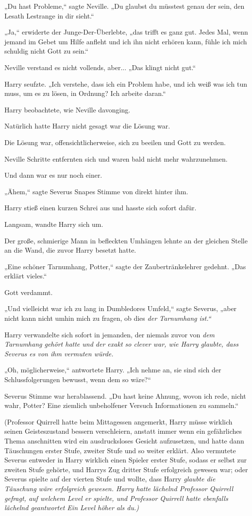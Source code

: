 {„Du hast Probleme,“ sagte Neville. „Du glaubst du müsstest genau der sein, den Lesath Lestrange in dir sieht.“

„Ja,“ erwiderte der Junge-Der-Überlebte, „das trifft es ganz gut. Jedes Mal, wenn jemand im Gebet um Hilfe anfleht und ich ihn nicht erhören kann, fühle ich mich schuldig nicht Gott zu sein.“

Neville verstand es nicht vollends, aber... „Das klingt nicht gut.“

Harry seufzte. „Ich verstehe, dass ich ein Problem habe, und ich weiß was ich tun muss, um es zu lösen, in Ordnung? Ich arbeite daran.“

Harry beobachtete, wie Neville davonging.

Natürlich hatte Harry nicht gesagt war die Lösung war.

Die Lösung war, offensichtlicherweise, sich zu beeilen und Gott zu werden.

Neville Schritte entfernten sich und waren bald nicht mehr wahrzunehmen.

Und dann war es nur noch einer.

„Ähem,“ sagte Severus Snapes Stimme von direkt hinter ihm.

Harry stieß einen kurzen Schrei aus und hasste sich sofort dafür.

Langsam, wandte Harry sich um.

Der große, schmierige Mann in befleckten Umhängen lehnte an der gleichen Stelle an die Wand, die zuvor Harry besetzt hatte.

„Eine schöner Tarnumhang, Potter,“ sagte der Zaubertränkelehrer gedehnt. „Das erklärt vieles.“

Gott verdammt.

„Und vielleicht war ich zu lang in Dumbledores Umfeld,“ sagte Severus, „aber nicht kann nicht umhin mich zu fragen, ob dies \emph{der Tarnumhang ist.“}

Harry verwandelte sich sofort in jemanden, der niemals zuvor von \emph{dem Tarnumhang gehört hatte und der \emph{exakt} so clever war, wie Harry glaubte, dass Severus es von ihm vermuten würde.}

„Oh, möglicherweise,“ antwortete Harry. „Ich nehme an, sie sind sich der Schlussfolgerungen bewusst, wenn dem so wäre?“

Severus Stimme war herablassend. „Du hast keine Ahnung, wovon ich rede, nicht wahr, Potter? Eine ziemlich unbeholfener Versuch Informationen zu sammeln.“

(Professor Quirrell hatte beim Mittagessen angemerkt, Harry müsse wirklich seinen Geisteszustand bessern verschleiern, anstatt immer wenn ein gefährliches Thema anschnitten wird ein ausdrucksloses Gesicht aufzusetzen, und hatte dann Täuschungen erster Stufe, zweiter Stufe und so weiter erklärt. Also vermutete Severus entweder in Harry wirklich einen Spieler erster Stufe, sodass er selbst zur zweiten Stufe gehörte, und Harrys Zug dritter Stufe erfolgreich gewesen war; oder Severus spielte auf der vierten Stufe und wollte, dass Harry \emph{glaubte die Täuschung wäre erfolgreich gewesen. Harry hatte lächelnd Professor Quirrell gefragt, auf welchem Level er spielte, und Professor Quirrell hatte ebenfalls lächelnd geantwortet \emph{Ein Level höher als du.})}

}
